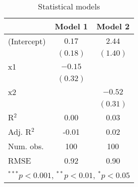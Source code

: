 
\usepackage{booktabs}

\begin{table}
\begin{center}
\begin{tabular}{l c c }
\toprule
 & Model 1 & Model 2 \\
\midrule
(Intercept) & $0.17$   & $2.44$   \\
            & $(0.18)$ & $(1.40)$ \\
x1          & $-0.15$  &          \\
            & $(0.32)$ &          \\
x2          &          & $-0.52$  \\
            &          & $(0.31)$ \\
\midrule
R$^2$       & 0.00     & 0.03     \\
Adj. R$^2$  & -0.01    & 0.02     \\
Num. obs.   & 100      & 100      \\
RMSE        & 0.92     & 0.90     \\
\bottomrule
\multicolumn{3}{l}{\scriptsize{$^{***}p<0.001$, $^{**}p<0.01$, $^*p<0.05$}}
\end{tabular}
\caption{Statistical models}
\label{table:coefficients}
\end{center}
\end{table}

